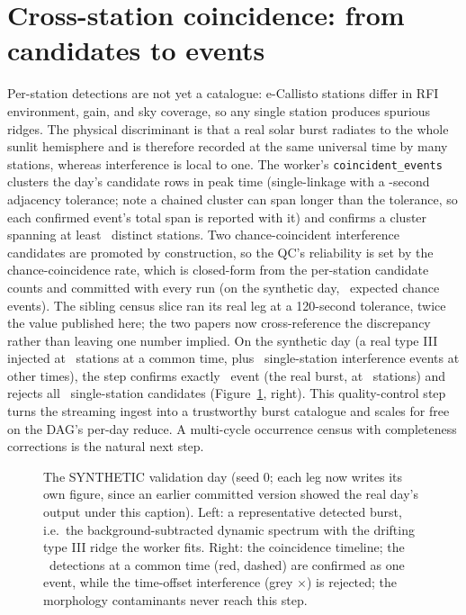 \documentclass[twocolumn]{aastex631}
\newcommand{\code}[1]{\texttt{#1}}
\begin{document}
\section{Cross-station coincidence: from candidates to events}
Per-station detections are not yet a catalogue: e-Callisto stations differ in RFI environment, gain, and
sky coverage, so any single station produces spurious ridges. The physical discriminant is that a
real solar burst radiates to the whole sunlit hemisphere and is therefore recorded at the same
universal time by many stations, whereas interference is local to one. The worker's
\code{coincident\_events} clusters the day's candidate rows in peak time (single-linkage with a \ecTolS-second adjacency tolerance; note a chained cluster can span longer than the tolerance, so each confirmed event's total span is reported with it) and confirms a cluster spanning at
least \ecMinStations\ distinct stations. Two chance-coincident interference candidates are
promoted by construction, so the QC's reliability is set by the chance-coincidence rate, which is
closed-form from the per-station candidate counts and committed with every run (on the synthetic
day, \ecSynChanceEvents\ expected chance events). The sibling census slice ran its real leg at a
120-second tolerance, twice the value published here; the two papers now cross-reference the
discrepancy rather than leaving one number implied. On the synthetic day (a real type III injected at \ecSynMaxEventStations\ stations at a
common time, plus \ecSynNrfiRejected\ single-station interference events at other times), the step confirms
exactly \ecSynNevents\ event (the real burst, at \ecSynMaxEventStations\ stations) and rejects all
\ecSynNrfiRejected\ single-station candidates (Figure~\ref{fig:ec}, right). This quality-control step turns
the streaming ingest into a trustworthy burst catalogue and scales for free on the DAG's per-day
reduce. A multi-cycle occurrence census with completeness corrections is the natural next step.

\begin{figure}
\caption{The SYNTHETIC validation day (seed 0; each leg now writes its own figure, since an earlier committed version showed the real day's output under this caption). Left: a representative
detected burst, i.e.\ the background-subtracted dynamic spectrum with the drifting type III
ridge the worker fits. Right: the coincidence timeline; the \ecSynMaxEventStations\ detections
at a common time (red, dashed) are confirmed as one event, while the time-offset interference
(grey $\times$) is rejected; the morphology contaminants never reach this step.}
\label{fig:ec}
\end{figure}
\end{document}
